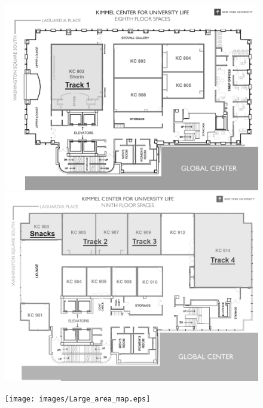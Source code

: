 \begin{figure}
\centering
\includegraphics[width=1\linewidth] {images/KC_8th_floor_2.png}
\includegraphics[width=1\linewidth] {images/KC_9th_floor_g.png}
\end{figure}

\begin{figure}
\centering
\texttt{[image: images/Large\_area\_map.eps]}
\end{figure}
